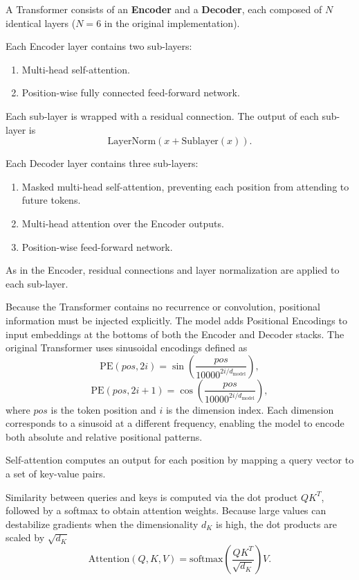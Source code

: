 A Transformer consists of an \textbf{Encoder} and a \textbf{Decoder}, each composed of $N$ identical layers ($N = 6$ in the original implementation).

Each Encoder layer contains two sub-layers:
\begin{enumerate}
    \item Multi-head self-attention.
    \item Position-wise fully connected feed-forward network.
\end{enumerate}
Each sub-layer is wrapped with a residual connection. The output of each sub-layer is
\[
\mathrm{LayerNorm}(x + \mathrm{Sublayer}(x)).
\]

Each Decoder layer contains three sub-layers:
\begin{enumerate}
    \item Masked multi-head self-attention, preventing each position from attending to future tokens.
    \item Multi-head attention over the Encoder outputs.
    \item Position-wise feed-forward network.
\end{enumerate}
As in the Encoder, residual connections and layer normalization are applied to each sub-layer.

Because the Transformer contains no recurrence or convolution, positional information must be injected explicitly. The model adds Positional Encodings to input embeddings at the bottoms of both the Encoder and Decoder stacks. The original Transformer uses sinusoidal encodings defined as
\[
\mathrm{PE}(pos, 2i) = \sin\left(\frac{pos}{10000^{2i / d_{\text{model}}}}\right),
\]
\[
\mathrm{PE}(pos, 2i+1) = \cos\left(\frac{pos}{10000^{2i / d_{\text{model}}}}\right),
\]
where $pos$ is the token position and $i$ is the dimension index. Each dimension corresponds to a sinusoid at a different frequency, enabling the model to encode both absolute and relative positional patterns.

Self-attention computes an output for each position by mapping a query vector to a set of key-value pairs.


Similarity between queries and keys is computed via the dot product $QK^{T}$, followed by a softmax to obtain attention weights. Because large values can destabilize gradients when the dimensionality $d_{K}$ is high, the dot products are scaled by $\sqrt{d_{K}}$
\begin{equation}
\label{eq:attention}
\mathrm{Attention}(Q, K, V)
= \mathrm{softmax}\left( \frac{QK^{T}}{\sqrt{d_{K}}} \right) V.
\end{equation}


